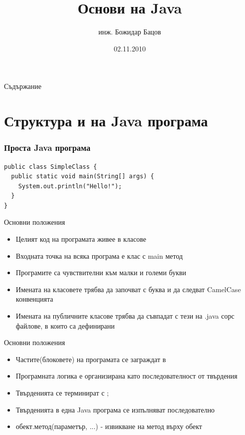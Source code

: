 \documentclass{beamer}
\title{Основи на Java}
\author{инж. Божидар Бацов}
\institute{Drow Ltd.}
\date{02.11.2010}
\begin{document}
\begin{frame}
  \titlepage
\end{frame}

\begin{frame}{Съдържание}
  \tableofcontents[pausesections]
\end{frame}

\section{Структура и на Java програма}

\begin{frame}[fragile]
  \transdissolve
  \frametitle{Проста Java програма}
\begin{lstlisting}
public class SimpleClass {
  public static void main(String[] args) {
    System.out.println("Hello!");
  }
}
\end{lstlisting}
\end{frame}

\begin{frame}{Основни положения}  
  \transdissolve
  \begin{itemize}
  \item Целият код на програмата живее в класове
  \item Входната точка на всяка програма е клас с main метод
  \item Програмите са чувствителни към малки и големи букви
  \item Имената на класовете трябва да започват с буква и да следват
    CamelCase конвенцията
  \item Имената на публичните класове трябва да съвпадат с тези на
    .java сорс файлове, в които са дефинирани
  \end{itemize}
\end{frame}

\begin{frame}{Основни положения}  
  \transdissolve
  \begin{itemize}
  \item Частите(блоковете) на програмата се заграждат в {}
  \item Програмната логика е организирана като последователност от твърдения
  \item Твърденията се терминират с ;
  \item Твърденията в една Java програма се изпълняват последователно
  \item обект.метод(параметър, ...) - извикване на метод върху обект
  \end{itemize}
\end{frame}
\end{document}

